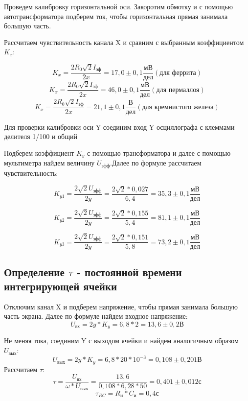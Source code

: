 \documentclass[a4paper]{article}
\begin{document}
Проведем калибровку горизонтальной оси. Закоротим обмотку и с помощью автотрансформатора подберем ток, чтобы горизонтальная прямая занимала 
большую часть.\par
Рассчитаем чувствительность канала X и сравним с выбранным коэффициентом $K_{x}$:

\[K_{x} = \frac{2R_{0} \sqrt{2} I_{\text{эф}}}{2x} = 17,0 \pm 0,1 \frac{\text{мВ}}{\text{дел}} (\text{для феррита})\]
\[K_{x} = \frac{2R_{0} \sqrt{2} I_{\text{эф}}}{2x} = 46,0 \pm 0,1 \frac{\text{мВ}}{\text{дел}} (\text{для пермаллоя})\]
\[K_{x} = \frac{2R_{0} \sqrt{2} I_{\text{эф}}}{2x} = 21,1 \pm 0,1 \frac{\text{В}}{\text{дел}} (\text{для кремнистого железа})\]

Для проверки калибровки оси Y соединим вход Y осциллографа с клеммами делителя 1/100 и общий\par
Подберем коэффициент $K_{y}$ с помощью трансформатора и далее с помощью мультиметра найдем величину $U_{\text{эфф}}$.Далее по формуле рассчитаем чувствительность:

\[K_{y1} = \frac{2 \sqrt{2} U_{\text{эфф}}}{2y} = \frac{2 \sqrt{2}*0,027}{6,4} = 35,3 \pm 0,1 \frac{\text{мВ}}{\text{дел}}\]

\[K_{y2} = \frac{2 \sqrt{2} U_{\text{эфф}}}{2y} = \frac{2 \sqrt{2}*0,155}{5,4} = 81,1 \pm 0,1 \frac{\text{мВ}}{\text{дел}}\]

\[K_{y3} = \frac{2 \sqrt{2} U_{\text{эфф}}}{2y} = \frac{2 \sqrt{2}*0,151}{5,8} = 73,2 \pm 0,1 \frac{\text{мВ}}{\text{дел}}\]

\subsection{Определение $\tau$ - постоянной времени интегрирующей ячейки}

Отключим канал X и подберем напряжение, чтобы прямая занимала большую часть экрана. Далее по формуле найдем входное напряжение:
\[U_{\text{вх}} = 2y*K_{y} = 6,8*2 = 13,6 \pm 0,2 \text{В}\]

Не меняя тока, соединим Y с выходом ячейки и найдем аналогичным образом $U_{\text{вых}}$:
\[U_{\text{вых}} = 2y*K_{y} = 6,8*20*10^{-3} = 0,108 \pm 0,201 \text{В}\]
Рассчитаем $\tau$:
\[\tau = \frac{U_{\text{вх}}}{\omega *U_{\text{вых}} } = \frac{13,6}{0,108*6,28*50} = 0,401 \pm 0,012 \text{с}\]
\[\tau_{RC} = R_{\text{и}}*C_{\text{и}}=0,4 \text{с}\]
\end{document}
